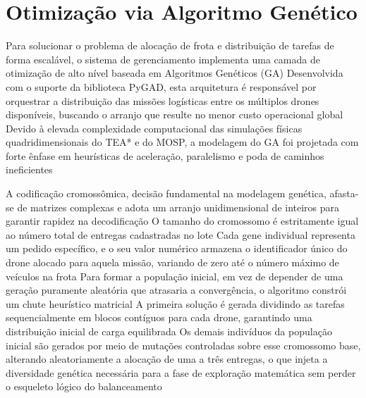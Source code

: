 \section{Otimização via Algoritmo Genético}\label{sec:dev-ga}

Para solucionar o problema de alocação de frota e distribuição de tarefas de forma escalável, o sistema de gerenciamento implementa uma camada de otimização de alto nível baseada em Algoritmos Genéticos (GA) %
Desenvolvida com o suporte da biblioteca PyGAD, esta arquitetura é responsável por orquestrar a distribuição das missões logísticas entre os múltiplos drones disponíveis, buscando o arranjo que resulte no menor custo operacional global %
Devido à elevada complexidade computacional das simulações físicas quadridimensionais do TEA* e do MOSP, a modelagem do GA foi projetada com forte ênfase em heurísticas de aceleração, paralelismo e poda de caminhos ineficientes %

A codificação cromossômica, decisão fundamental na modelagem genética, afasta-se de matrizes complexas e adota um arranjo unidimensional de inteiros para garantir rapidez na decodificação %
O tamanho do cromossomo é estritamente igual ao número total de entregas cadastradas no lote %
Cada gene individual representa um pedido específico, e o seu valor numérico armazena o identificador único do drone alocado para aquela missão, variando de zero até o número máximo de veículos na frota %
Para formar a população inicial, em vez de depender de uma geração puramente aleatória que atrasaria a convergência, o algoritmo constrói um chute heurístico matricial %
A primeira solução é gerada dividindo as tarefas sequencialmente em blocos contíguos para cada drone, garantindo uma distribuição inicial de carga equilibrada %
Os demais indivíduos da população inicial são gerados por meio de mutações controladas sobre esse cromossomo base, alterando aleatoriamente a alocação de uma a três entregas, o que injeta a diversidade genética necessária para a fase de exploração matemática sem perder o esqueleto lógico do balanceamento %

